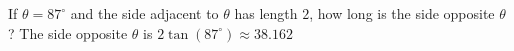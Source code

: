 {If $\theta = 87^{\circ}$ and the side adjacent to $\theta$ has length $2$, how long is the side opposite $\theta$?}
{The side opposite $\theta$ is $2\tan(87^{\circ}) \approx 38.162$}
